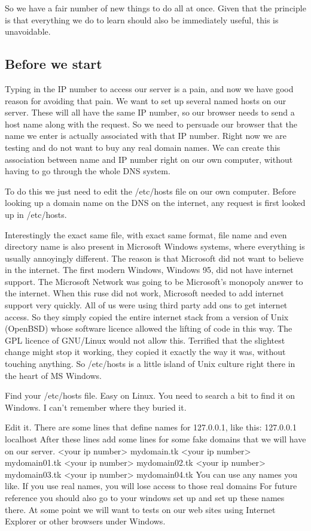 \documentclass[12pt, a4paper]{article}
\begin{document}
So we have a fair number of new things to do all at once. Given that the principle is that everything we do to learn should also be immediately useful, this is unavoidable.

\subsection*{Before we start} 

Typing in the IP number to access our server is a pain, and now we have good reason for avoiding that pain. We want to set up several named hosts on our server. These will all have the same IP number, so our browser needs to send a host name along with the request. So we need to persuade our browser that the name we enter is actually associated with that IP number. Right now we are testing and do not want to buy any real domain names. We can create this association between name and IP number right on our own computer, without having to go through the whole DNS system.

To do this we just need to edit the /etc/hosts file on our own computer. Before looking up a domain name on the DNS on the internet, any request is first looked up in /etc/hosts.

Interestingly the exact same file, with exact same format, file name and even directory name is also present in Microsoft Windows systems, where everything is usually annoyingly different. The reason is that Microsoft did not want to believe in the internet. The first modern Windows, Windows 95, did not have internet support. The Microsoft Network was going to be Microsoft’s monopoly answer to the internet. When this ruse did not work, Microsoft needed to add internet support very quickly. All of us were using third party add ons to get internet access. So they simply copied the entire internet stack from a version of Unix (OpenBSD) whose software licence allowed the lifting of code in this way. The GPL licence of GNU/Linux would not allow this. Terrified that the slightest change might stop it working, they copied it exactly the way it was, without touching anything. So /etc/hosts is a little island of Unix culture right there in the heart of MS Windows. 

Find your /etc/hosts file. Easy on Linux. You need to search a bit to find it on Windows. I can’t remember where they buried it.

Edit it. There are some lines that define names for 127.0.0.1, like this:
127.0.0.1	localhost
After these lines add some lines for some fake domains that we will have on our server.
<your ip number>	mydomain.tk
<your ip number>	mydomain01.tk
<your ip number>	mydomain02.tk
<your ip number>	mydomain03.tk
<your ip number>	mydomain04.tk
You can use any names you like. If you use real names, you will lose access to those real domains
For future reference you should also go to your windows set up and set up these names there. At some point we will want to tests on our web sites using Internet Explorer or other browsers under Windows.
\end{document}
